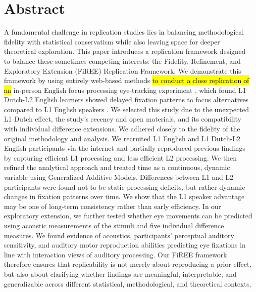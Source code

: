 \section{Abstract}
A fundamental challenge in replication studies lies in balancing methodological fidelity with statistical conservatism while also leaving space for deeper theoretical exploration. This paper introduces a  replication framework designed to balance these sometimes competing interests: the Fidelity, Refinement, and Exploratory Extension (FiREE) Replication Framework. We demonstrate this framework by using entirely web-based methods \hl{to conduct a close replication of an} in-person English focus processing eye-tracking experiment \parencite{ge2021a}, which found L1 Dutch-L2 English learners showed delayed fixation patterns to focus alternatives compared to L1 English speakers \parencite{mcmanus2024replication2}. We selected this study due to the unexpected L1 Dutch effect, the study's recency and open materials, and its compatibility with individual difference extensions. We adhered closely to the fidelity of the original methodology and analysis. We recruited L1 English and L1 Dutch-L2 English participants via the internet and partially reproduced previous findings by capturing efficient L1 processing and less efficient L2 processing. We then refined the analytical approach and treated time as a continuous, dynamic variable using Generalized Additive Models. Differences between L1 and L2 participants were found not to be static processing deficits, but rather dynamic changes in fixation patterns over time. We show that the L1 speaker advantage may be one of long-term consistency rather than early efficiency. In our exploratory extension, we further tested whether eye movements can be predicted using acoustic measurements of the stimuli and five individual difference measures. We found evidence of acoustics, participants' perceptual auditory sensitivity, and auditory motor reproduction abilities predicting eye fixations in line with interaction views of auditory processing. Our FiREE framework therefore ensures that replicability is not merely about reproducing a prior effect, but also about clarifying whether findings are meaningful, interpretable, and generalizable across different statistical, methodological, and theoretical contexts.

